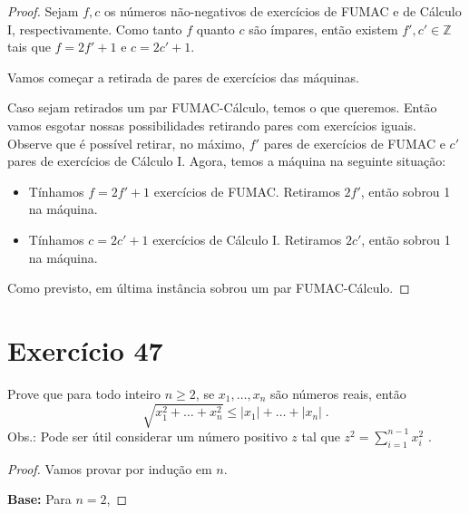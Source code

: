 \documentclass{article}
\newcommand{\base}{\textbf{Base: }}
\begin{document}
\begin{proof}
Sejam $f,c$ os números não-negativos de exercícios de FUMAC e de Cálculo I, respectivamente.
Como tanto $f$ quanto $c$ são ímpares, então existem $f' , c' \in \mathbb{Z}$ tais que $f = 2f' + 1$ e $c = 2c' + 1$.

Vamos começar a retirada de pares de exercícios das máquinas.

Caso sejam retirados um par FUMAC-Cálculo, temos o que queremos.
Então vamos esgotar nossas possibilidades retirando pares com exercícios iguais.
Observe que é possível retirar, no máximo, $f'$ pares de exercícios de FUMAC e $c'$ pares de exercícios de Cálculo I.
Agora, temos a máquina na seguinte situação:
\begin{itemize}
  \item Tínhamos $f = 2f' + 1$ exercícios de FUMAC. Retiramos $2f'$, então sobrou 1 na máquina.
  \item Tínhamos $c = 2c' + 1$ exercícios de Cálculo I. Retiramos $2c'$, então sobrou 1 na máquina.
\end{itemize}
Como previsto, em última instância sobrou um par FUMAC-Cálculo.

\end{proof}

\section*{Exercício 47}
Prove que para todo inteiro $n \geq 2$, se $x_1,\dots, x_n$ são números reais, então
\[
\sqrt{x_1^2 + \dots + x_n^2} \leq |x_1| + \dots + |x_n| \; .
\]
Obs.: Pode ser útil considerar um número positivo $z$ tal que $z^2 = \sum_{i=1}^{n-1} x_i^2$ .

\begin{proof}
Vamos provar por indução em $n$.

\base Para $n=2$, 
\end{proof}
\end{document}
